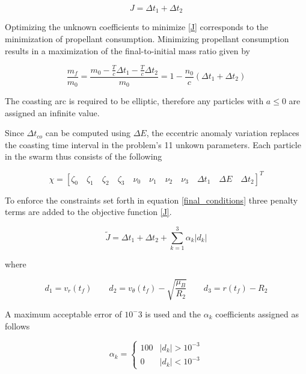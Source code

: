 \begin{equation}
J = \Delta t_1 + \Delta t_2
\label{J}
\end{equation}

\noindent Optimizing the unknown coefficients to minimize \ref{J} corresponds to the minimization of propellant consumption. Minimizing propellant consumption
results in a maximization of the final-to-initial mass ratio given by 

\begin{equation}
\dfrac{m_f}{m_0} = \dfrac{m_0-\frac{T}{c}\Delta t_1-\frac{T}{c}\Delta t_2}{m_0} = 1-\dfrac{n_0}{c}(\Delta t_1 +\Delta t_2)
\label{finalToInitialMassRatio}
\end{equation}

\noindent The coasting arc is required to be elliptic, therefore any particles with $a \leq 0$ are assigned an infinite value. \newline

Since $\Delta t_{co}$ can be computed using $\Delta E$, the eccentric anomaly variation replaces the coasting time interval in the 
problem's 11 unkown parameters. Each particle in the swarm thus consists of the following

\begin{equation}
\chi = [ \zeta_0 \quad \zeta_1 \quad \zeta_2 \quad \zeta_3 \quad \nu_0 \quad \nu_1 \quad \nu_2 \quad \nu_3 \quad \Delta t_1 \quad \Delta E \quad \Delta t_2 ]^T
\label{particleUnkowns}
\end{equation}

To enforce the constraints set forth in equation \ref{final_conditions} three penalty terms are added to the objective function \ref{J}.

\begin{equation}
\tilde{J} = \Delta t_1 + \Delta t_2 + \sum_{k=1}^3 \alpha_k|d_k| 
\label{JwithPenalty}
\end{equation}

\noindent where 

\begin{equation}
d_1 = v_r(t_f) \quad \quad d_2 = v_\theta(t_f) - \sqrt{\dfrac{\mu_B}{R_2}} \quad \quad 
d_3 = r(t_f)-R_2
\label{penaltyValues}
\end{equation}

\noindent A maximum acceptable error of $10^-3$ is used and the $\alpha_k$ coefficients assigned as follows 

\begin{equation}
\alpha_k = \begin{cases}
    100 & |d_k| > 10^{-3} \\
    0 & |d_k| < 10^{-3}
\end{cases}
\end{equation}


